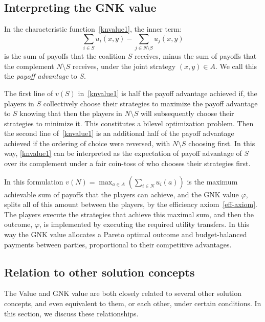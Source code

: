 \subsection{Interpreting the GNK value}\label{the_value_def4}

In the characteristic function~\eqref{knvalue1}, the inner term:
\[
\sum_{i\in S} u_i(x,y) - \sum_{j\in N\setminus S} u_j(x,y)
\] 
is the sum of payoffs that the coalition $S$ receives, 
minus the sum of payoffs that the complement $N\setminus S$ receives, 
under the joint strategy $(x,y)\in A$. 
We call this the \textit{payoff advantage} to $S$.

The first line of $v(S)$ in~\eqref{knvalue1} is half the payoff advantage achieved if, the players in $S$ collectively choose their strategies to maximize the payoff advantage to $S$ knowing that then the players in $N\setminus S$ will subsequently choose their strategies to minimize it.
This constitutes a bilevel optimization problem.
Then the second line of~\eqref{knvalue1} is an additional half of the payoff advantage achieved if the ordering of choice were reversed, with $N\setminus S$ choosing first.
In this way, \eqref{knvalue1} can be interpreted as the expectation of payoff advantage of $S$ over its complement under a fair coin-toss of who chooses their strategies first.

In this formulation $v(N) = \max_{a\in A} (\sum_{i\in N} u_i(a))$ is the maximum achievable sum of payoffs that the players can achieve, and the GNK value $\varphi$, splits all of this amount between the players, by the efficiency axiom~\eqref{eff-axiom}.
The players execute the strategies that achieve this maximal sum, and then the outcome, $\varphi$, is implemented by executing the required utility transfers.
In this way the GNK value allocates a Pareto optimal outcome and budget-balanced payments between parties, proportional to their competitive advantages.

\subsection{Relation to other solution concepts}\label{relating_to_the_old}

The Value and GNK value are both closely related to several other solution concepts, and even equivalent to them, or each other, under certain conditions. In this section, we discuss these relationships.

